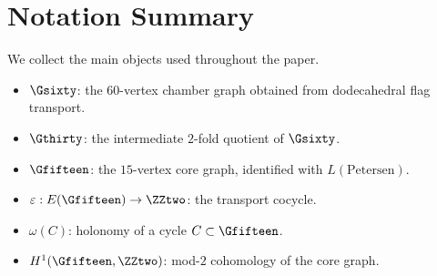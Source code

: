 \section{Notation Summary}

We collect the main objects used throughout the paper.

\begin{itemize}
\item $\Gsixty$: the $60$-vertex chamber graph obtained from dodecahedral
flag transport.

\item $\Gthirty$: the intermediate $2$-fold quotient of $\Gsixty$.

\item $\Gfifteen$: the $15$-vertex core graph, identified with
$L(\mathrm{Petersen})$.

\item $\varepsilon : E(\Gfifteen)\to\ZZtwo$: the transport cocycle.

\item $\omega(C)$: holonomy of a cycle $C\subset \Gfifteen$.

\item $H^1(\Gfifteen,\ZZtwo)$: mod-$2$ cohomology of the core graph.
\end{itemize}

